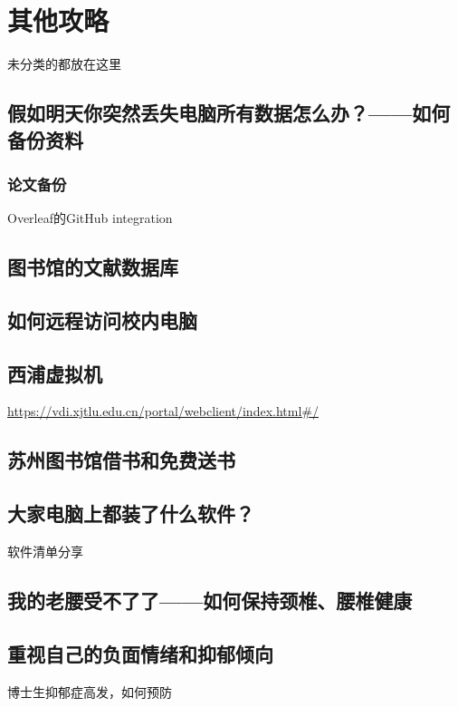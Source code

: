 
\chapter{其他攻略}

未分类的都放在这里

\section{假如明天你突然丢失电脑所有数据怎么办？——如何备份资料}
\subsection{论文备份}
Overleaf的GitHub integration
\section{图书馆的文献数据库}
\section{如何远程访问校内电脑}
\section{西浦虚拟机}
\url{https://vdi.xjtlu.edu.cn/portal/webclient/index.html#/}
\section{苏州图书馆借书和免费送书}
\section{大家电脑上都装了什么软件？}
软件清单分享
\section{我的老腰受不了了——如何保持颈椎、腰椎健康}
\section{重视自己的负面情绪和抑郁倾向}
博士生抑郁症高发，如何预防
